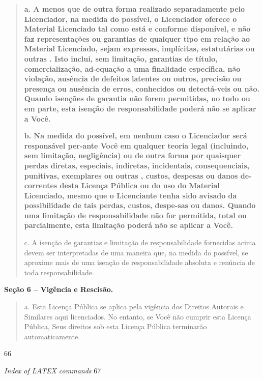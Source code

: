 \documentclass[
]{article}
\begin{document}
\begin{quote}
\textbf{a. A menos que de outra forma realizado separadamente pelo
Licenciador, na medida do possível, o Licenciador oferece o Material
Licenciado tal como está e conforme disponível, e não faz representações
ou garantias de qualquer tipo em relação ao Material Licenciado, sejam
expressas, implícitas, estatutárias ou outras . Isto inclui, sem
limitação, garantias de título, comercialização, ad-equação a uma
finalidade específica, não violação, ausência de defeitos latentes ou
outros, precisão ou presença ou ausência de erros, conhecidos ou
detectá-veis ou não. Quando isenções de garantia não forem permitidas,
no todo ou em parte, esta isenção de responsabilidade poderá não se
aplicar a Você.}

\textbf{b. Na medida do possível, em nenhum caso o Licenciador será
responsável per-ante Você em qualquer teoria legal (incluindo, sem
limitação, negligência) ou de outra forma por quaisquer perdas diretas,
especiais, indiretas, incidentais, consequenciais, punitivas, exemplares
ou outras , custos, despesas ou danos de-correntes desta Licença Pública
ou do uso do Material Licenciado, mesmo que o Licenciante tenha sido
avisado da possibilidade de tais perdas, custos, despe-sas ou danos.
Quando uma limitação de responsabilidade não for permitida, total ou
parcialmente, esta limitação poderá não se aplicar a Você.}

c. A isenção de garantias e limitação de responsabilidade fornecidas
acima devem ser interpretadas de uma maneira que, na medida do possível,
se aproxime mais de uma isenção de responsabilidade absoluta e renúncia
de toda responsabilidade.
\end{quote}

\textbf{Seção 6 -- Vigência e Rescisão.}

\begin{quote}
a. Esta Licença Pública se aplica pela vigência dos Direitos Autorais e
Similares aqui licenciados. No entanto, se Você não cumprir esta Licença
Pública, Seus direitos sob esta Licença Pública terminarão
automaticamente.
\end{quote}

66

\emph{Index of LATEX commands} 67
\end{document}
